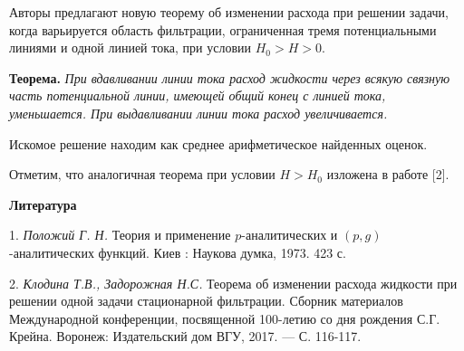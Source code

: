 Авторы предлагают новую теорему об изменении расхода при решении задачи, когда варьируется
область фильтрации, ограниченная тремя потенциальными линиями и одной линией тока, при условии
$H_0>H>0$.

\textbf{Теорема.} {\it При вдавливании линии тока расход жидкости через всякую
связную часть потенциальной линии, имеющей общий конец с линией тока, уменьшается.
При выдавливании линии тока расход увеличивается.}

Искомое решение находим как среднее арифметическое найденных оценок.

Отметим, что аналогичная теорема при условии $H>H_0$  изложена в работе [2].

\smallskip \centerline {\bf Литература} \nopagebreak

1. {\it Положий Г. Н.} Теория и применение $p$-аналитических
и $(p,g)$-аналитических функций. Киев : Наукова думка, 1973.  423 с.

2. {\it Клодина Т.В., Задорожная Н.С.} Теорема об изменении расхода жидкости при решении
одной задачи стационарной фильтрации. Сборник материалов Международной конференции,
посвященной 100-летию со дня рождения С.Г. Крейна. Воронеж: Издательский дом ВГУ, 2017. — С. 116-117.


